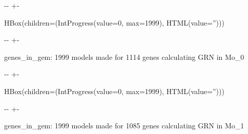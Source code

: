 \documentclass[letterpaper,10pt,english]{sphinxmanual}
\newlength\nbsphinxcodecellspacing
\begin{document}
{

\kern-\sphinxverbatimsmallskipamount\kern-\baselineskip
\kern+\FrameHeightAdjust\kern-\fboxrule
\vspace{\nbsphinxcodecellspacing}

\begin{sphinxVerbatim}[commandchars=\\\{\}]
HBox(children=(IntProgress(value=0, max=1999), HTML(value='')))
\end{sphinxVerbatim}
}

{

\kern-\sphinxverbatimsmallskipamount\kern-\baselineskip
\kern+\FrameHeightAdjust\kern-\fboxrule
\vspace{\nbsphinxcodecellspacing}

\begin{sphinxVerbatim}[commandchars=\\\{\}]

genes\_in\_gem: 1999
models made for 1114 genes
calculating GRN in Mo\_0
\end{sphinxVerbatim}
}

{

\kern-\sphinxverbatimsmallskipamount\kern-\baselineskip
\kern+\FrameHeightAdjust\kern-\fboxrule
\vspace{\nbsphinxcodecellspacing}

\begin{sphinxVerbatim}[commandchars=\\\{\}]
HBox(children=(IntProgress(value=0, max=1999), HTML(value='')))
\end{sphinxVerbatim}
}

{

\kern-\sphinxverbatimsmallskipamount\kern-\baselineskip
\kern+\FrameHeightAdjust\kern-\fboxrule
\vspace{\nbsphinxcodecellspacing}

\begin{sphinxVerbatim}[commandchars=\\\{\}]

genes\_in\_gem: 1999
models made for 1085 genes
calculating GRN in Mo\_1
\end{sphinxVerbatim}
}
\end{document}
